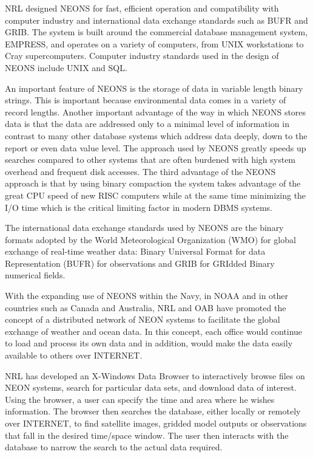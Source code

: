 \bigskip
{}
\bigskip

	NRL designed NEONS for fast, efficient operation and compatibility 
with computer industry and international data exchange standards such as 
BUFR and GRIB.  The system is built around the commercial database 
management system, EMPRESS, and operates on a variety of computers, 
from UNIX workstations to Cray supercomputers.  Computer industry 
standards used in the design of NEONS include UNIX and SQL.

	An important feature of NEONS is the storage of data in variable 
length binary strings.  This is important because environmental data 
comes in a variety of record lengths.  Another important advantage of the 
way in which NEONS stores data is that the data are addressed only to a 
minimal level of information in contrast to many other database systems 
which address data deeply, down to the report or even data value level.  
The approach used by NEONS greatly speeds up searches compared to other 
systems that are often burdened with high system overhead and frequent 
disk accesses.  The third advantage of the NEONS approach is that by using 
binary compaction the system takes advantage of the great CPU speed of 
new RISC computers while at the same time minimizing the I/O time 
which is the critical limiting factor in modern DBMS systems.   

	The international data exchange standards used by NEONS are the 
binary formats adopted by the World Meteorological Organization (WMO) 
for global exchange of real-time weather data:  Binary Universal Format 
for data Representation (BUFR) for observations and GRIB for GRIdded 
Binary numerical fields.  
 
\bigskip
{}
\bigskip

	With the expanding use of NEONS within the Navy, in NOAA and in 
other countries such as Canada and Australia, NRL and OAB have promoted 
the concept of a distributed network of NEON systems to facilitate the 
global exchange of weather and ocean data.  In this concept, each office 
would continue to load and process its own data and in addition, would 
make the data easily available to others over INTERNET.  

	NRL has developed an X-Windows Data Browser to interactively 
browse files on NEON systems, search for particular data sets, and 
download data of interest.  Using the browser, a user can specify the time 
and area where he wishes information.  The browser then searches the 
database, either locally or remotely over INTERNET, to find satellite 
images, gridded model outputs or observations that fall in the desired 
time/space window.  The user then interacts with the database to narrow 
the search to the actual data required.

